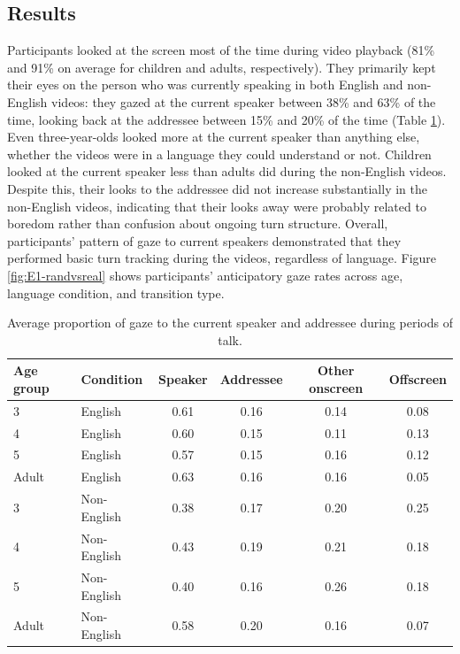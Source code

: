 \documentclass[authoryear, 12pt]{elsarticle}
\begin{document}
\subsection{Results}
\label{sec:results1}

Participants looked at the screen most of the time during video playback (81\% and 91\% on average for children and adults, respectively). They primarily kept their eyes on the person who was currently speaking in both English and non-English videos: they gazed at the current speaker between 38\% and 63\% of the time, looking back at the addressee between 15\% and 20\% of the time (Table \ref{tab:e1_look}). Even three-year-olds looked more at the current speaker than anything else, whether the videos were in a language they could understand or not. Children looked at the current speaker less than adults did during the non-English videos. Despite this, their looks to the addressee did not increase substantially in the non-English videos, indicating that their looks away were probably related to boredom rather than confusion about ongoing turn structure. Overall, participants' pattern of gaze to current speakers demonstrated that they performed basic turn tracking during the videos, regardless of language. Figure \ref{fig:E1-randvsreal} shows participants' anticipatory gaze rates across age, language condition, and transition type.

\linespread{1}
\begin{table}[t]
\begin{center}
  \begin{tabular}{llcccc}
    \hline
    Age group & Condition & Speaker & Addressee & Other onscreen & Offscreen\\ 
    \hline
    3 & English & 0.61 & 0.16 & 0.14 & 0.08 \\ 
    4 & English & 0.60 & 0.15 & 0.11 & 0.13 \\ 
    5 & English & 0.57 & 0.15 & 0.16 & 0.12 \\ 
    Adult & English & 0.63 & 0.16 & 0.16 & 0.05 \\ 
    3 & Non-English & 0.38 & 0.17 & 0.20 & 0.25 \\ 
    4 & Non-English & 0.43 & 0.19 & 0.21 & 0.18 \\ 
    5 & Non-English & 0.40 & 0.16 & 0.26 & 0.18 \\ 
    Adult & Non-English & 0.58 & 0.20 & 0.16 & 0.07 \\ 
    \hline
  \end{tabular}
\end{center}
  \caption{Average proportion of gaze to the current speaker and addressee during periods of talk.}
\label{tab:e1_look}
\end{table}
\end{document}
